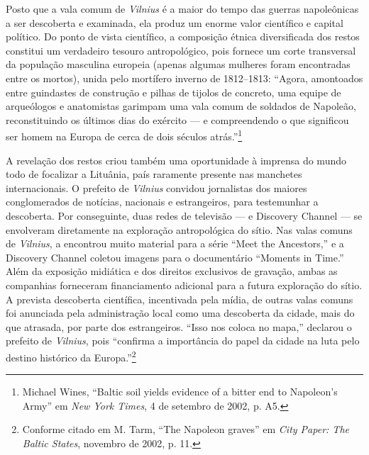 Posto que a vala comum de \textit{Vilnius} é a maior do tempo das guerras
napoleônicas a ser descoberta e examinada, ela produz um enorme valor
científico e capital político. Do ponto de vista científico, a
composição étnica diversificada dos restos constitui um verdadeiro
tesouro antropológico, pois fornece um corte transversal da população
masculina europeia (apenas algumas mulheres foram encontradas entre os
mortos), unida pelo mortífero inverno de 1812--1813: ``Agora, amontoados
entre guindastes de construção e pilhas de tijolos de concreto, uma
equipe de arqueólogos e anatomistas garimpam uma vala comum de soldados
de Napoleão, reconstituindo os últimos dias do exército --- e
compreendendo o que significou ser homem na Europa de cerca de dois
séculos atrás.''\footnote{Michael Wines, ``Baltic soil yields evidence of a bitter end to Napoleon's Army'' em \textit{New York Times}, 4 de setembro de 2002, p. A5.}

A revelação dos restos criou também uma oportunidade à imprensa do mundo
todo de focalizar a Lituânia, país raramente presente nas manchetes
internacionais. O prefeito de \textit{Vilnius} convidou jornalistas dos maiores
conglomerados de notícias, nacionais e estrangeiros, para testemunhar a
descoberta. Por conseguinte, duas redes de televisão ---  e Discovery
Channel --- se envolveram diretamente na exploração antropológica do
sítio. Nas valas comuns de \textit{Vilnius}, a  encontrou muito material para
a série ``Meet the Ancestors,'' e a Discovery Channel coletou imagens
para o documentário ``Moments in Time.'' Além da exposição midiática e
dos direitos exclusivos de gravação, ambas as companhias forneceram
financiamento adicional para a futura exploração do sítio. A prevista
descoberta científica, incentivada pela mídia, de outras valas comuns
foi anunciada pela administração local como uma descoberta da cidade,
mais do que atrasada, por parte dos estrangeiros. ``Isso nos coloca no
mapa,'' declarou o prefeito de \textit{Vilnius}, pois ``confirma a importância do
papel da cidade na luta pelo destino histórico da Europa.''\footnote{Conforme citado em M. Tarm, ``The Napoleon graves'' em \textit{City Paper: The Baltic States}, novembro de 2002, p. 11.}


